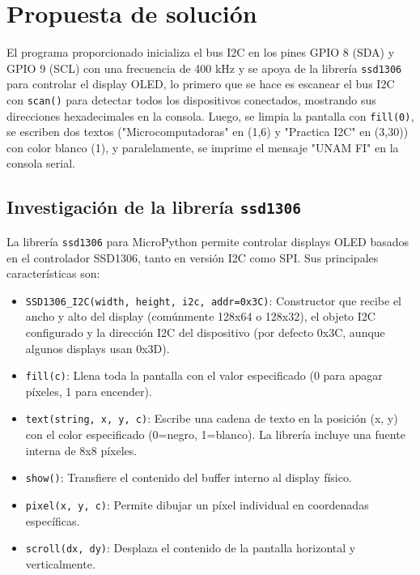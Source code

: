 \documentclass[letterpaper,12pt]{article}
\begin{document}
    \section*{Propuesta de solución}

    El programa proporcionado inicializa el bus I2C en los pines GPIO 8 (SDA) y GPIO 9 (SCL) con una frecuencia de 400 kHz y se apoya de la librería \texttt{ssd1306} para controlar el display OLED, lo primero que se hace es escanear el bus I2C con \texttt{scan()} para detectar todos los dispositivos conectados, mostrando sus direcciones hexadecimales en la consola. Luego, se limpia la pantalla con \texttt{fill(0)}, se escriben dos textos ("Microcomputadoras" en (1,6) y "Practica I2C" en (3,30)) con color blanco (1), y paralelamente, se imprime el mensaje "UNAM FI" en la consola serial.

    \subsection*{Investigación de la librería \texttt{ssd1306}}

    La librería \texttt{ssd1306} para MicroPython permite controlar displays OLED basados en el controlador SSD1306, tanto en versión I2C como SPI. Sus principales características son:

    \begin{itemize}
        \item \texttt{SSD1306\_I2C(width, height, i2c, addr=0x3C)}: Constructor que recibe el ancho y alto del display (com\'unmente 128x64 o 128x32), el objeto I2C configurado y la direcci\'on I2C del dispositivo (por defecto 0x3C, aunque algunos displays usan 0x3D).
        \item \texttt{fill(c)}: Llena toda la pantalla con el valor especificado (0 para apagar p\'ixeles, 1 para encender).
        \item \texttt{text(string, x, y, c)}: Escribe una cadena de texto en la posici\'on (x, y) con el color especificado (0=negro, 1=blanco). La librer\'ia incluye una fuente interna de 8x8 p\'ixeles.
        \item \texttt{show()}: Transfiere el contenido del buffer interno al display f\'isico.
        \item \texttt{pixel(x, y, c)}: Permite dibujar un p\'ixel individual en coordenadas espec\'ificas.
        \item \texttt{scroll(dx, dy)}: Desplaza el contenido de la pantalla horizontal y verticalmente.
    \end{itemize}
\end{document}
